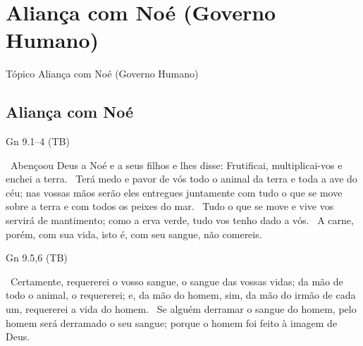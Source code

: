 \documentclass[12pt,aspectratio=169]{beamer}
\newcommand{\ver}[1]{%
    \raisebox{0.50ex}{%
        \scalebox{1.1}{%
            \pmb{\textbf{\textcolor{BSpbg}{#1}}}%
        }%
    }%
}
\newcommand{\QUOTE}[1]{%
    \par\noindent\hspace*{0.05\linewidth}%
    \begin{minipage}{0.9\linewidth}%
        \linespread{1.35}\large{#1}%
    \end{minipage}%
}
\newcommand{\RED}[1]{{\textcolor{TXred}{#1}}}
\newcommand{\ORA}[1]{{\textcolor{TXred!50!TXyel}{#1}}}
\newcommand{\YEL}[1]{{\textcolor{TXyel}{#1}}}
\newcommand{\GRE}[1]{{\textcolor{TXgre}{#1}}}
\newcommand{\CYA}[1]{{\textcolor{TXcya}{#1}}}
\begin{document}
\section{Aliança com Noé (Governo Humano)}

    \begin{frame}
        \par\noindent\hspace*{0.05\linewidth}%
        \begin{minipage}{0.9\linewidth}%
            \linespread{1.35}\large%
            \begin{alertblock}{Tópico}
                Aliança com Noé (Governo Humano)
            \end{alertblock}
        \end{minipage}%
    \end{frame}

    \subsection{Aliança com Noé}

    \begin{frame}{Gn 9.1--4 (TB)}
        \QUOTE{%
            \ver{1}~Abençoou Deus a Noé e a seus filhos e lhes disse: \YEL{Frutificai,
            multiplicai-vos e enchei a terra}.
            \ver{2}~Terá \ORA{medo e pavor de vós todo o animal da terra e toda a ave do céu};
            nas vossas mãos serão eles entregues juntamente com tudo o que se move sobre a terra
            e com todos os peixes do mar.
            \ver{3}~Tudo o que se move e vive vos servirá de mantimento; \YEL{como a erva verde,
            tudo vos tenho dado a vós}.
            \ver{4}~A carne, porém, com sua vida, isto é, com seu \RED{sangue, não comereis}.
        }
    \end{frame}

    \begin{frame}{Gn 9.5,6 (TB)}
        \QUOTE{%
            \ver{5}~\YEL{Certamente, requererei o vosso sangue}, o sangue das vossas vidas;
            \ORA{da mão de todo o animal, o requererei}; e, \RED{da mão do homem}, sim, da mão
            do irmão de cada um, requererei a vida do homem.
            \ver{6}~\YEL{Se alguém derramar o sangue do homem}, \GRE{pelo homem será derramado o
            seu sangue}; porque \CYA{o homem foi feito à imagem de Deus}.
        }
    \end{frame}
\end{document}
